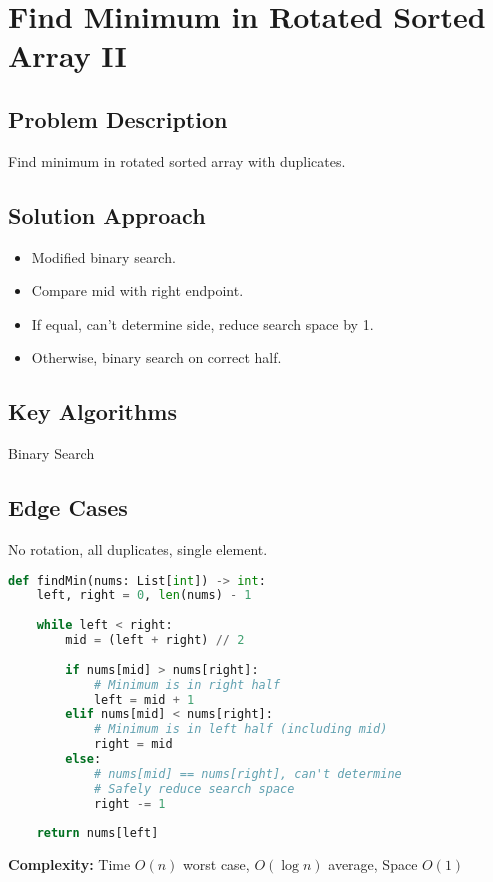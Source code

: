 \documentclass[10pt, a4paper]{article}
\begin{document}
\section{Find Minimum in Rotated Sorted Array II}
\subsection*{Problem Description}
Find minimum in rotated sorted array with duplicates.

\subsection*{Solution Approach}
\begin{itemize}
    \item Modified binary search.
    \item Compare mid with right endpoint.
    \item If equal, can't determine side, reduce search space by 1.
    \item Otherwise, binary search on correct half.
\end{itemize}

\subsection*{Key Algorithms}
Binary Search

\subsection*{Edge Cases}
No rotation, all duplicates, single element.

\begin{lstlisting}[language=Python]
def findMin(nums: List[int]) -> int:
    left, right = 0, len(nums) - 1
    
    while left < right:
        mid = (left + right) // 2
        
        if nums[mid] > nums[right]:
            # Minimum is in right half
            left = mid + 1
        elif nums[mid] < nums[right]:
            # Minimum is in left half (including mid)
            right = mid
        else:
            # nums[mid] == nums[right], can't determine
            # Safely reduce search space
            right -= 1
    
    return nums[left]
\end{lstlisting}
\textbf{Complexity:} Time $O(n)$ worst case, $O(\log n)$ average, Space $O(1)$
\end{document}
